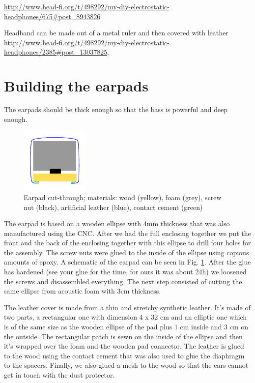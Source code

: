 \documentclass{article}
\begin{document}
\url{http://www.head-fi.org/t/498292/my-diy-electrostatic-headphones/675#post_8943826}

Headband can be made out of a metal ruler and then covered with leather \url{http://www.head-fi.org/t/498292/my-diy-electrostatic-headphones/2385#post_13037825}.

\section{Building the earpads}
\label{s:pads}
The earpads should be thick enough so that the bass is powerful and deep enough.
\begin{figure}
\centering
\includegraphics[width=0.3\textwidth]{images/earpad.pdf}
\caption{Earpad cut-through; materials: wood (yellow), foam (grey), screw nut (black), artificial leather (blue), contact cement (green)}
\label{f:pads:cut}
\end{figure}
The earpad is based on a wooden ellipse with 4mm thickness that was also manufactured using the CNC. After we had the full enclosing together we put the front and the back of the enclosing together with this ellipse to drill four holes for the assembly. The screw nuts were glued to the inside of the ellipse using copious amounts of epoxy. A schematic of the earpad can be seen in Fig. \ref{f:pads:cut}. After the glue has hardened (see your glue for the time, for ours it was about 24h) we loosened the screws and disassembled everything. The next step consisted of cutting the same ellipse from acoustic foam with 3cm thickness.

The leather cover is made from a thin and stretchy synthetic leather. It's made of two parts, a rectangular one with dimension 4 x 32 cm and an elliptic one which is of the same size as the wooden ellipse of the pad plus 1 cm inside and 3 cm on the outside. The rectangular patch is sewn on the inside of the ellipse and then it's wrapped over the foam and the wooden pad connector. The leather is glued to the wood using the contact cement that was also used to glue the diaphragm to the spacers. Finally, we also glued a mesh to the wood so that the ears cannot get in touch with the dust protector.
\end{document}
